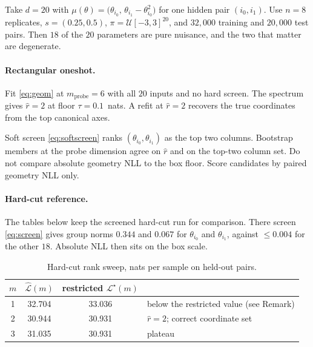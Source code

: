 \documentclass[11pt, letterpaper]{article}
\theoremstyle{definition}
\begin{document}
Take $d=20$ with
$\mu(\theta)=\bigl(\theta_{i_0},\,\theta_{i_1}-\theta_{i_0}^2\bigr)$ for one
hidden pair $(i_0,i_1)$. Use $n=8$ replicates, $s=(0.25,0.5)$,
$\pi=\mathcal{U}[-3,3]^{20}$, and $32{,}000$ training and $20{,}000$ test pairs.
Then $18$ of the $20$ parameters are pure nuisance, and the two that matter are
degenerate.

\paragraph{Rectangular oneshot.}
Fit \eqref{eq:geom} at $m_{\mathrm{probe}}=6$ with all $20$ inputs and no hard
screen. The spectrum gives $\hat r=2$ at floor $\tau=0.1$~nats.
A refit at $\hat r=2$ recovers the true coordinates from the top canonical
axes.

Soft screen \eqref{eq:softscreen} ranks
$(\theta_{i_0},\theta_{i_1})$ as the top two columns.
Bootstrap members at the probe dimension agree on $\hat r$ and on the top-two
column set. Do not compare absolute geometry NLL to the box floor.
Score candidates by paired geometry NLL only.

\paragraph{Hard-cut reference.}
The tables below keep the screened hard-cut run for comparison.
There screen \eqref{eq:screen} gives group norms $0.344$ and $0.067$ for
$\theta_{i_0}$ and $\theta_{i_1}$, against $\le0.004$ for the other $18$.
Absolute NLL then sits on the box scale.

\begin{table}[h]
\centering
\begin{tabular}{cccl}
\toprule
$m$ & $\hat{\mathcal{L}}(m)$ & restricted $\mathcal{L}^\star(m)$ & \\
\midrule
1 & 32.704 & 33.036 & below the restricted value (see Remark) \\
2 & 30.944 & 30.931 & $\hat r=2$; correct coordinate set \\
3 & 31.035 & 30.931 & plateau \\
\bottomrule
\end{tabular}
\caption{Hard-cut rank sweep, nats per sample on held-out pairs.}
\end{table}
\end{document}
